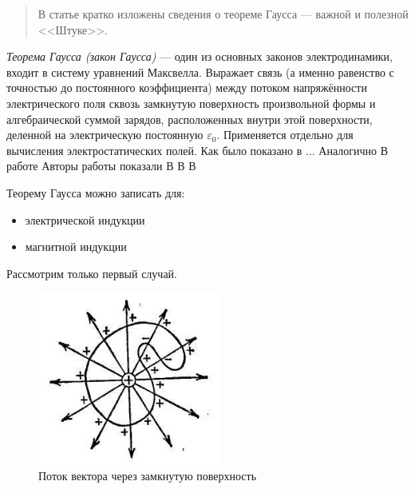 \documentclass{amcs}
\begin{document}


\newcommand{\vect}[1]{\boldsymbol{\mathbf{#1}}}

\maketitlepage

\begin{abstract}
  В статье кратко изложены сведения о теореме Гаусса --- важной и полезной <<Штуке>>.
\end{abstract}

\tableofcontents


\emph{Теорема Гаусса (закон Гаусса)} --- один из основных законов электродинамики, входит в систему уравнений Максвелла. Выражает связь (а именно равенство с точностью до постоянного коэффициента) между потоком напряжённости электрического поля сквозь замкнутую поверхность произвольной формы и алгебраической суммой зарядов, расположенных внутри этой поверхности, деленной на электрическую постоянную $\varepsilon_0$. Применяется отдельно для вычисления электростатических полей. Как было показано в \cite{Tito2017,Gold1987} ...
Аналогично \cite{Pozdnyakov2006}
В работе \cite{Feenstra1995}
Авторы работы \cite{Yoon2005} показали
В \cite{Yutani1996,Tito2017,Yoon2005}
В \cite{Yoon2005}
В \cite{Penner1999}



Теорему Гаусса можно записать для:
\begin{itemize}
\item{электрической индукции}
\item{магнитной индукции}
\end{itemize}

Рассмотрим только первый случай.

\begin{figure}[ht!]
\centering
\includegraphics[width=60mm]{L2_p1.jpg}
\caption{Поток вектора через замкнутую поверхность \label{figCurves}}
\end{figure}
\end{document}
